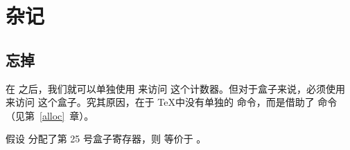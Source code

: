 \documentclass{book}
\begin{document}
\section{杂记}

\subsection{忘掉 }

在  之后，我们就可以单独使用  来访问  这个计数器。但对于盒子来说，必须使用  来访问  这个盒子。究其原因，在于 \TeX 中没有单独的  命令，而是借助了  命令（见第~\ref{alloc}~章）。

\begin{example}
假设 \textup{} 分配了第 25 号盒子寄存器，则 \textup{ }等价于 \textup{}。
\end{example}

\end{document}
